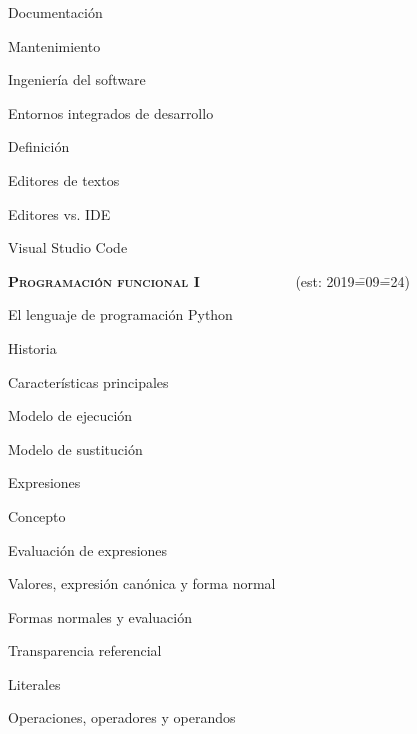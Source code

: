 \begin{longenum}
\begin{longenum}
\begin{longenum}
            \item Documentación
            \item Mantenimiento
            \item Ingeniería del software
        \end{longenum}
        \item Entornos integrados de desarrollo
        \begin{longenum}
            \item Definición
            \item Editores de textos
            \item Editores vs. IDE
            \item Visual Studio Code
        \end{longenum}
    \end{longenum}
    \item \textbf{\textsc{Programación funcional I}} \ \ \ \ \ \ \ \ \ \ \ \ \ (est: 2019\==09\==24)
    \begin{longenum}
        \item El lenguaje de programación Python
        \begin{longenum}
            \item Historia
            \item Características principales
        \end{longenum}
        \item Modelo de ejecución
        \begin{longenum}
            \item Modelo de sustitución
        \end{longenum}
        \item Expresiones
        \begin{longenum}
            \item Concepto
            \item Evaluación de expresiones
            \begin{longenum}
                \item Valores, expresión canónica y forma normal
                \item Formas normales y evaluación
                \item Transparencia referencial
            \end{longenum}
            \item Literales
            \item Operaciones, operadores y operandos

\end{longenum}
\end{longenum}
\end{longenum}
